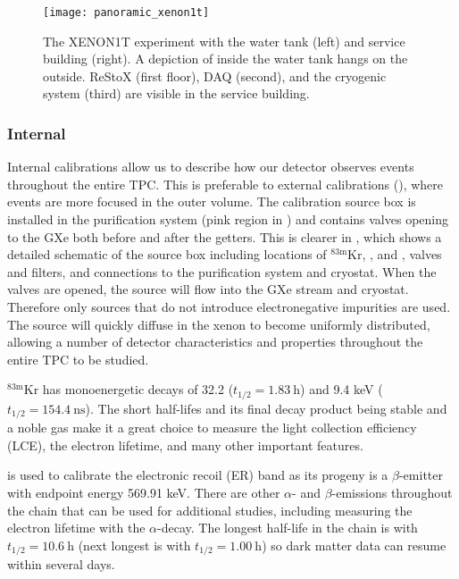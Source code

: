 \begin{figure}
\centering
\texttt{[image: panoramic\_xenon1t]}
\caption{The XENON1T experiment with the water tank (left) and service building (right).  A depiction of inside the water tank
hangs on the outside.  ReStoX (first floor), DAQ (second), and the cryogenic system (third) are visible in the service building.}
\label{fig:xenon1t_panoramic}
\end{figure}

\subsubsection{Internal}
\label{subsubsec:xenon1t_calibrations_internal}
Internal calibrations allow us to describe how our detector observes events throughout the entire TPC.  This is preferable to external
calibrations (), where events are more focused in the outer volume.  The calibration
source box is installed in the
purification system (pink region in
) and contains valves opening to the GXe both before and after the
getters.  This is clearer in , which shows a detailed schematic of the source box including
locations of $\mathrm{^{83m}Kr}$, , and , valves and filters, and connections to the purification system and
cryostat.  When the valves are opened,
the source will flow into the GXe stream and cryostat.  Therefore only sources that do not introduce
electronegative impurities are used.  The source will quickly diffuse in the xenon to become uniformly distributed,
allowing a number of detector characteristics and properties throughout the entire TPC to be studied.

$\mathrm{^{83m}Kr}$ has monoenergetic decays of 32.2 ($t_{1/2} = 1.83\ \mathrm{h}$) and 9.4 keV
($t_{1/2} = 154.4\ \mathrm{ns}$).  The short
half-lifes and its final decay product  being stable and a noble gas make it a great choice to measure the light collection
efficiency (LCE), the electron lifetime, and many other important features.

\radoncal is used to calibrate the electronic recoil (ER) band as its progeny  is a $\beta$-emitter with endpoint energy
569.91 keV.  There are other $\alpha$- and $\beta$-emissions throughout the chain that can be used for additional studies,
including measuring the electron lifetime with the  $\alpha$-decay.  The longest half-life in the chain is
 with $t_{1/2} = 10.6\ \mathrm{h}$ (next longest is  with $t_{1/2} = 1.00\ \mathrm{h}$) so dark matter data
can resume within several days.

